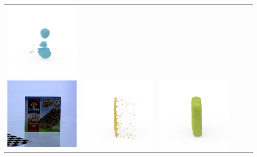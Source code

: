 \documentclass[10pt,onecolumn,letterpaper]{article}
\begin{document}
\begin{tabular}{cccccc}
\includegraphics[height=\turnheight, clip=true, trim=60 30 30 5]{red_bull_NP4_0_oma_view_270} \\
\includegraphics[height=\turnheight, clip=true, trim=20 30 30 5]{quaker_big_chewy_chocolate_chip.png} &
\includegraphics[height=\turnheight, clip=true, trim=60 30 30 5]{quaker_big_chewy_chocolate_chip_NP1_0_visible_pixels_view_0.png} &
\includegraphics[height=\turnheight, clip=true, trim=60 30 30 5]{quaker_big_chewy_chocolate_chip_NP1_0_gt_view_0.png} &

\end{tabular}
\end{document}
